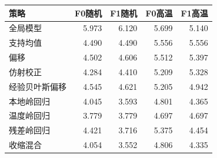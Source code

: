\begin{tabular}{lrrrr}
\toprule
策略 & F0随机 & F1随机 & F0高温 & F1高温 \\
\midrule
全局模型 & 5.973 & 6.120 & 5.699 & 5.140 \\
支持均值 & 4.490 & 4.490 & 5.556 & 5.556 \\
偏移 & 4.502 & 4.606 & 5.512 & 5.397 \\
仿射校正 & 4.284 & 4.410 & 5.209 & 5.328 \\
经验贝叶斯偏移 & 4.545 & 4.621 & 5.205 & 4.942 \\
本地岭回归 & 4.045 & 3.593 & 4.801 & 4.365 \\
温度岭回归 & 3.779 & 3.779 & 4.697 & 4.697 \\
残差岭回归 & 4.421 & 3.716 & 5.375 & 4.454 \\
收缩混合 & 4.054 & 3.552 & 4.806 & 4.335 \\
\bottomrule
\end{tabular}
